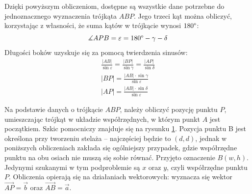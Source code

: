 Dzięki powyższym obliczeniom, dostępne są wszystkie dane potrzebne do jednoznacznego wyznaczenia trójkąta $ABP$. Jego trzeci kąt można obliczyć, korzystając z własności, że suma kątów w trójkącie wynosi $180\degree$:
\[
\measuredangle APB = \varepsilon = 180\degree - \gamma - \delta
\]
Długości boków uzyskuje się za pomocą twierdzenia sinusów:
\begin{gather*}
\frac{|AB|}{\sin\varepsilon} = \frac{|BP|}{\sin\gamma} = \frac{|AP|}{\sin\delta} \\[1em]
|BP| = \frac{|AB| \cdot \sin\gamma}{\sin\varepsilon} \\[1em]
|AP| = \frac{|AB| \cdot \sin\delta}{\sin\varepsilon}
\end{gather*}

Na podstawie danych o trójkącie $ABP$, należy obliczyć pozycję punktu $P$, umieszczając trójkąt w układzie współrzędnych, w którym punkt $A$ jest początkiem. Szkic pomocniczy znajduje się na rysunku \ref{trojkat_kartezjanskie}. Pozycja punktu B jest określona przy tworzeniu stelaża -- najczęściej będzie to $(d, d)$, jednak w poniższych obliczeniach zakłada się ogólniejszy przypadek, gdzie współrzędne punktu na obu osiach nie muszą się sobie równać. Przyjęto oznaczenie $B(w, h)$. Jedynymi szukanymi w tym podproblemie są $x$ oraz $y$, czyli współrzędne punktu $P$. Obliczenia opierają się na działaniach wektorowych: wyznacza się wektor $\overrightarrow{AP} = \overrightarrow{b}$ oraz $\overrightarrow{AB} = \overrightarrow{a}$.

\begin{figure}[h!]
\begin{center}

\end{center}
\label{trojkat_kartezjanskie}
\end{figure} 

